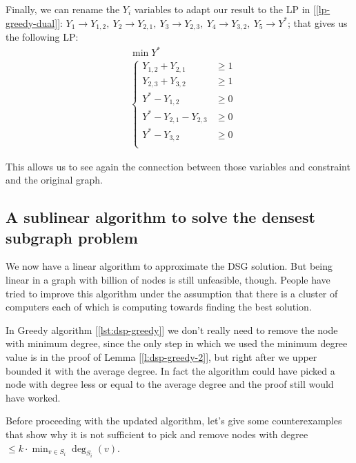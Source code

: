 \begin{ex}
    Finally, we can rename the $Y_i$ variables to adapt our result to the LP in [\ref{lp-greedy-dual}]: $Y_1 \rightarrow Y_{1,2}, \ Y_2 \rightarrow Y_{2,1}, \ Y_3 \rightarrow Y_{2,3}, \ Y_4 \rightarrow Y_{3,2}, \ Y_5 \rightarrow Y^*$; that gives us the following LP:
    \begin{equation*}
    \begin{aligned}
    &\min Y^*\\
    &\begin{cases}
    Y_{1,2} + Y_{2,1} &\geq 1\\
    Y_{2,3} + Y_{3,2} &\geq 1\\
    Y^* - Y_{1,2} &\geq 0\\
    Y^* - Y_{2,1} - Y_{2,3} &\geq 0\\
    Y^* - Y_{3,2} &\geq 0\\
    \end{cases}
    \end{aligned}
    \end{equation*}
    
    This allows us to see again the connection between those variables and constraint and the original graph.
\end{ex}


\subsection{A sublinear algorithm to solve the densest subgraph problem} \label{sec:dsp-sublinear}

We now have a linear algorithm to approximate the DSG solution. But being linear in a graph with billion of nodes is still unfeasible, though. People have tried to improve this algorithm under the assumption that there is a cluster of computers each of which is computing towards finding the best solution.

\begin{obs}
    In Greedy algorithm [\ref{lst:dsp-greedy}] we don't really need to remove the node with minimum degree, since the only step in which we used the minimum degree value is in the proof of Lemma [\ref{l:dsp-greedy-2}], but right after we upper bounded it with the average degree. In fact the algorithm could have picked a node with degree less or equal to the average degree and the proof still would have worked.
\end{obs}

Before proceeding with the updated algorithm, let's give some counterexamples that show why it is not sufficient to pick and remove nodes with degree $\leq k \cdot \min_{v \in S_i} \deg_{S_i}(v)$.

